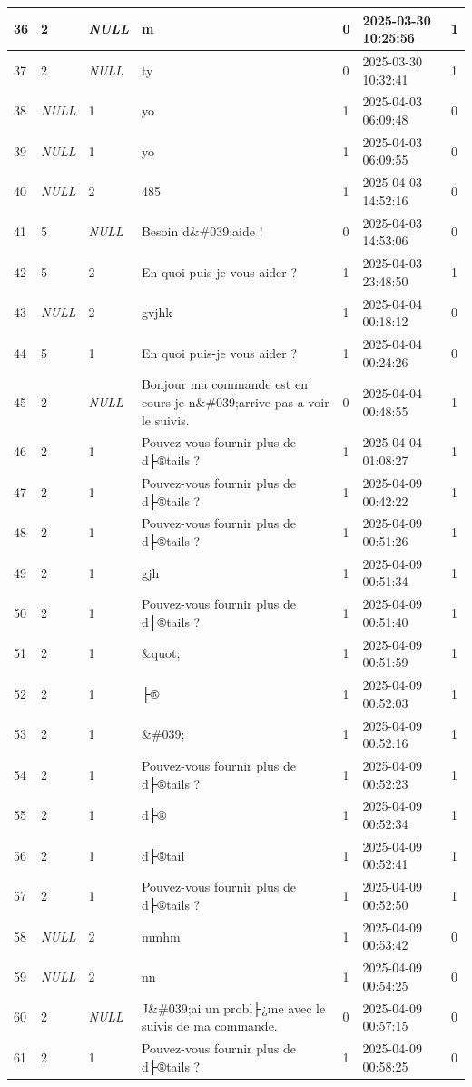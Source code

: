 \begin{longtable}{|l|l|l|l|l|l|l|}
36 & 2 & \textit{NULL} & m & 0 & 2025-03-30 10:25:56 & 1 \\ \hline 
37 & 2 & \textit{NULL} & ty & 0 & 2025-03-30 10:32:41 & 1 \\ \hline 
38 & \textit{NULL} & 1 & yo & 1 & 2025-04-03 06:09:48 & 0 \\ \hline 
39 & \textit{NULL} & 1 & yo & 1 & 2025-04-03 06:09:55 & 0 \\ \hline 
40 & \textit{NULL} & 2 & 485 & 1 & 2025-04-03 14:52:16 & 0 \\ \hline 
41 & 5 & \textit{NULL} & Besoin d\&\#039;aide ! & 0 & 2025-04-03 14:53:06 & 0 \\ \hline 
42 & 5 & 2 & En quoi puis-je vous aider ? & 1 & 2025-04-03 23:48:50 & 1 \\ \hline 
43 & \textit{NULL} & 2 & gvjhk & 1 & 2025-04-04 00:18:12 & 0 \\ \hline 
44 & 5 & 1 & En quoi puis-je vous aider ? & 1 & 2025-04-04 00:24:26 & 0 \\ \hline 
45 & 2 & \textit{NULL} & Bonjour ma commande est en cours je n\&\#039;arrive pas a voir le suivis. & 0 & 2025-04-04 00:48:55 & 1 \\ \hline 
46 & 2 & 1 & Pouvez-vous fournir plus de d├®tails ? & 1 & 2025-04-04 01:08:27 & 1 \\ \hline 
47 & 2 & 1 & Pouvez-vous fournir plus de d├®tails ? & 1 & 2025-04-09 00:42:22 & 1 \\ \hline 
48 & 2 & 1 & Pouvez-vous fournir plus de d├®tails ? & 1 & 2025-04-09 00:51:26 & 1 \\ \hline 
49 & 2 & 1 & gjh & 1 & 2025-04-09 00:51:34 & 1 \\ \hline 
50 & 2 & 1 & Pouvez-vous fournir plus de d├®tails ? & 1 & 2025-04-09 00:51:40 & 1 \\ \hline 
51 & 2 & 1 & \&quot; & 1 & 2025-04-09 00:51:59 & 1 \\ \hline 
52 & 2 & 1 & ├® & 1 & 2025-04-09 00:52:03 & 1 \\ \hline 
53 & 2 & 1 & \&\#039; & 1 & 2025-04-09 00:52:16 & 1 \\ \hline 
54 & 2 & 1 & Pouvez-vous fournir plus de d├®tails ? & 1 & 2025-04-09 00:52:23 & 1 \\ \hline 
55 & 2 & 1 & d├® & 1 & 2025-04-09 00:52:34 & 1 \\ \hline 
56 & 2 & 1 & d├®tail & 1 & 2025-04-09 00:52:41 & 1 \\ \hline 
57 & 2 & 1 & Pouvez-vous fournir plus de d├®tails ? & 1 & 2025-04-09 00:52:50 & 1 \\ \hline 
58 & \textit{NULL} & 2 & mmhm & 1 & 2025-04-09 00:53:42 & 0 \\ \hline 
59 & \textit{NULL} & 2 & nn & 1 & 2025-04-09 00:54:25 & 0 \\ \hline 
60 & 2 & \textit{NULL} & J\&\#039;ai un probl├¿me avec le suivis de ma commande. & 0 & 2025-04-09 00:57:15 & 0 \\ \hline 
61 & 2 & 1 & Pouvez-vous fournir plus de d├®tails ? & 1 & 2025-04-09 00:58:25 & 0 \\ \hline 
 \end{longtable}

